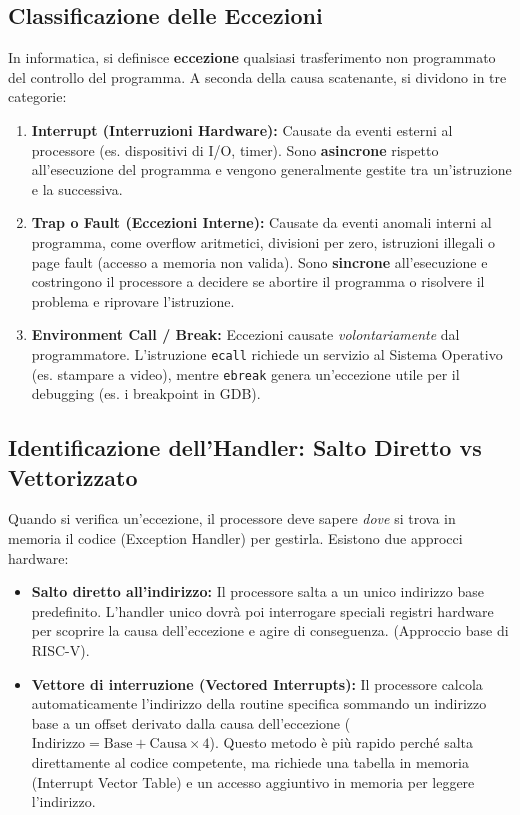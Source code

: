 \documentclass[12pt, a4paper]{article}
\begin{document}
\subsection{Classificazione delle Eccezioni}
In informatica, si definisce \textbf{eccezione} qualsiasi trasferimento non programmato del controllo del programma. A seconda della causa scatenante, si dividono in tre categorie:
\begin{enumerate}
    \item \textbf{Interrupt (Interruzioni Hardware):} Causate da eventi esterni al processore (es. dispositivi di I/O, timer). Sono \textbf{asincrone} rispetto all'esecuzione del programma e vengono generalmente gestite tra un'istruzione e la successiva.
    \item \textbf{Trap o Fault (Eccezioni Interne):} Causate da eventi anomali interni al programma, come overflow aritmetici, divisioni per zero, istruzioni illegali o page fault (accesso a memoria non valida). Sono \textbf{sincrone} all'esecuzione e costringono il processore a decidere se abortire il programma o risolvere il problema e riprovare l'istruzione.
    \item \textbf{Environment Call / Break:} Eccezioni causate \textit{volontariamente} dal programmatore. L'istruzione \texttt{ecall} richiede un servizio al Sistema Operativo (es. stampare a video), mentre \texttt{ebreak} genera un'eccezione utile per il debugging (es. i breakpoint in GDB).
\end{enumerate}

\subsection{Identificazione dell'Handler: Salto Diretto vs Vettorizzato}
Quando si verifica un'eccezione, il processore deve sapere \textit{dove} si trova in memoria il codice (Exception Handler) per gestirla. Esistono due approcci hardware:
\begin{itemize}
    \item \textbf{Salto diretto all'indirizzo:} Il processore salta a un unico indirizzo base predefinito. L'handler unico dovrà poi interrogare speciali registri hardware per scoprire la causa dell'eccezione e agire di conseguenza. (Approccio base di RISC-V).
    \item \textbf{Vettore di interruzione (Vectored Interrupts):} Il processore calcola automaticamente l'indirizzo della routine specifica sommando un indirizzo base a un offset derivato dalla causa dell'eccezione ($\text{Indirizzo} = \text{Base} + \text{Causa} \times 4$). Questo metodo è più rapido perché salta direttamente al codice competente, ma richiede una tabella in memoria (Interrupt Vector Table) e un accesso aggiuntivo in memoria per leggere l'indirizzo.
\end{itemize}
\end{document}
